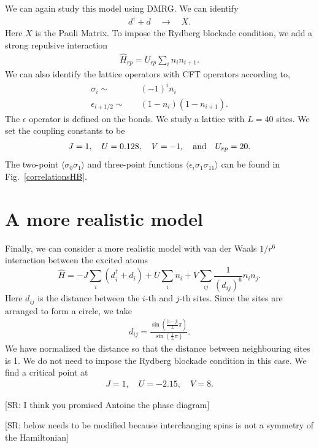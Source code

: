 \documentclass[prb,twocolumn,11pt]{revtex4-1}
\newcommand{\SR}[1]{{\color{red} [SR: #1]}}
\begin{document}
We can again study this model using DMRG. We can identify 
\begin{align}
    d^{\dagger}+d \quad \rightarrow  \quad X.
\end{align}
Here $X$ is the Pauli Matrix. 
To impose the Rydberg blockade condition, we add a strong repulsive interaction 
\begin{align}
    \hat{H}_{rp}=U_{rp} \sum_i n_i n_{i+1}.
\end{align}
We can also identify the lattice operators with CFT operators according to,
\begin{align}   
    \sigma_i \sim &\quad  (-1)^i n_i \nonumber\\
    \epsilon_{i+1/2} \sim & \quad (1-n_{i})(1-n_{i+1}).
\end{align}
The $\epsilon$ operator is defined on the bonds. 
We study a lattice with $L=40$ sites. We set the coupling constants to be 
\begin{align}
    J=1,\quad U=0.128, \quad V=-1, \quad {\rm and}\quad U_{rp}=20.
\end{align}
The two-point $\langle\sigma_0 \sigma_1\rangle$ and three-point functions  $\langle \epsilon_i \sigma_1 \sigma_{11}\rangle$ can be found in Fig.~\ref{correlationsHB}.


\section{A more realistic model}
Finally, we can consider a more realistic model with van der Waals $1/r^6$ interaction between the excited atoms
\begin{equation}
    \hat{H}=-J \sum_i (d_i^{\dagger}+d_i)+ U \sum_i n_i + V\sum_{ij}\frac{1}{(d_{ij})^6}  n_{i}n_{j}.
\end{equation}
Here $d_{ij}$ is the distance between the $i$-th and $j$-th sites. Since the sites are arranged to form a circle, we take
\begin{align}
    d_{ij}=\frac{\sin(\frac{|i-j|}{L}\pi)}{\sin(\frac{1}{L}\pi)}.
\end{align}
We have normalized the distance so that the distance between neighbouring sites is 1.
We do not need to impose the Rydberg blockade condition in this case.
We find a critical point at
\begin{align}
    J=1,\quad U=-2.15,\quad  V=8.
\end{align}

\SR{I think you promised Antoine the phase diagram}

\SR{below needs to be modified because interchanging spins is not a symmetry of the Hamiltonian}
\end{document}
